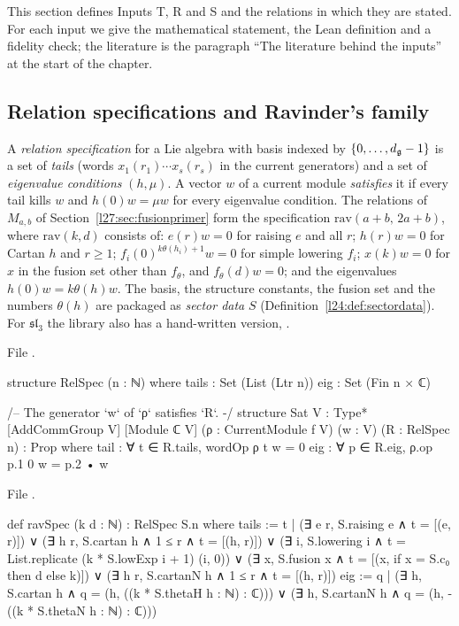 This section defines Inputs T, R and S and the relations in which they are stated. For each input we give the mathematical
statement, the Lean definition and a fidelity check; the literature is the paragraph ``The literature behind the inputs'' at the
start of the chapter.

\subsection{Relation specifications and Ravinder's family}\label{l27:sec:relspec}

\begin{definition}\label{l27:def:relspec}
A \emph{relation specification} for a Lie algebra with basis indexed by $\{0,\dots,d_{\mathfrak g}-1\}$ is a set of
\emph{tails} (words $x_1(r_1)\cdots x_s(r_s)$ in the current generators) and a set of \emph{eigenvalue conditions} $(h,\mu)$.
A vector $w$ of a current module \emph{satisfies} it if every tail kills $w$ and $h(0)w=\mu w$ for every eigenvalue
condition. The relations of $M_{a,b}$ of Section~\ref{l27:sec:fusionprimer} form the specification
$\mathrm{rav}(a+b,\,2a+b)$, where $\mathrm{rav}(k,d)$ consists of: $e(r)w=0$ for raising $e$ and all $r$; $h(r)w=0$ for Cartan
$h$ and $r\ge1$; $f_i(0)^{k\theta(h_i)+1}w=0$ for simple lowering $f_i$; $x(k)w=0$ for $x$ in the fusion set other than
$f_\theta$, and $f_\theta(d)w=0$; and the eigenvalues $h(0)w=k\theta(h)w$. The basis, the structure constants, the fusion set
and the numbers $\theta(h)$ are packaged as \emph{sector data} $S$ (Definition~\ref{l24:def:sectordata}). For $\mathfrak{sl}_3$ the
library also has a hand-written version, .
\end{definition}
\noindent File .
\begin{leancode}
structure RelSpec (n : ℕ) where
  tails : Set (List (Ltr n))
  eig : Set (Fin n × ℂ)

/-- The generator `w` of `ρ` satisfies `R`. -/
structure Sat {V : Type*} [AddCommGroup V] [Module ℂ V] (ρ : CurrentModule f V) (w : V)
    (R : RelSpec n) : Prop where
  tail : ∀ t ∈ R.tails, wordOp ρ t w = 0
  eig : ∀ p ∈ R.eig, ρ.op p.1 0 w = p.2 • w
\end{leancode}
\noindent File .
\begin{leancode}
def ravSpec (k d : ℕ) : RelSpec S.n where
  tails := {t | (∃ e r, S.raising e ∧ t = [(e, r)]) ∨ (∃ h r, S.cartan h ∧ 1 ≤ r ∧ t = [(h, r)]) ∨
    (∃ i, S.lowering i ∧ t = List.replicate (k * S.lowExp i + 1) (i, 0)) ∨
    (∃ x, S.fusion x ∧ t = [(x, if x = S.c₀ then d else k)]) ∨
    (∃ h r, S.cartanN h ∧ 1 ≤ r ∧ t = [(h, r)])}
  eig := {q | (∃ h, S.cartan h ∧ q = (h, ((k * S.thetaH h : ℕ) : ℂ))) ∨
    (∃ h, S.cartanN h ∧ q = (h, -((k * S.thetaN h : ℕ) : ℂ)))}
\end{leancode}
